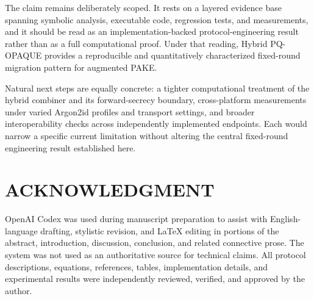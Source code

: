 \documentclass[conference]{IEEEtran}
\begin{document}
The claim remains deliberately scoped. It rests on a layered evidence base spanning symbolic analysis, executable code, regression tests, and measurements, and it should be read as an implementation-backed protocol-engineering result rather than as a full computational proof. Under that reading, Hybrid PQ-OPAQUE provides a reproducible and quantitatively characterized fixed-round migration pattern for augmented PAKE.

Natural next steps are equally concrete: a tighter computational treatment of the hybrid combiner and its forward-secrecy boundary, cross-platform measurements under varied Argon2id profiles and transport settings, and broader interoperability checks across independently implemented endpoints. Each would narrow a specific current limitation without altering the central fixed-round engineering result established here.

\section*{ACKNOWLEDGMENT}
OpenAI Codex was used during manuscript preparation to assist with English-language drafting, stylistic revision, and \LaTeX{} editing in portions of the abstract, introduction, discussion, conclusion, and related connective prose. The system was not used as an authoritative source for technical claims. All protocol descriptions, equations, references, tables, implementation details, and experimental results were independently reviewed, verified, and approved by the author.
\end{document}
